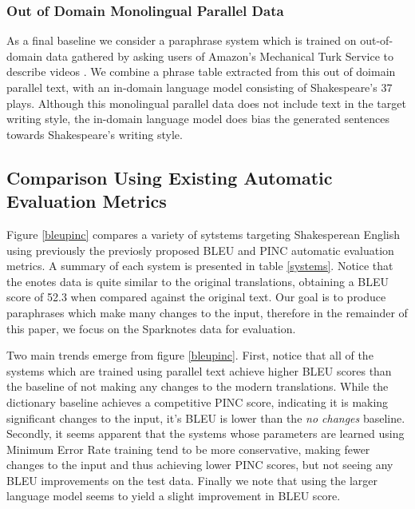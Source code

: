 \documentclass[10pt,a5paper,twoside]{article}
\begin{document}
\subsubsection{Out of Domain Monolingual Parallel Data}
As a final baseline we consider a paraphrase system which is trained on out-of-domain data gathered by asking users of Amazon's Mechanical Turk Service 
\cite{Snow08} to describe videos \cite{chen11}.  We combine a phrase table extracted from this out of doimain parallel text, with an in-domain
language model consisting of Shakespeare's 37 plays.  Although this monolingual parallel data does not include text in the target writing style,
the in-domain language model does bias the generated sentences towards Shakespeare's writing style.

\subsection{Comparison Using Existing Automatic Evaluation Metrics}
Figure \ref{bleupinc} compares a variety of sytstems targeting Shakesperean English using previously the previosly proposed BLEU \cite{Papineni02} and PINC \cite{chen11} automatic evaluation metrics.  A summary of each system is presented in table \ref{systems}.  Notice that the enotes data is quite similar to the original translations,
obtaining a BLEU score of 52.3 when compared against the original text.  Our goal is to produce paraphrases which make many changes to the input, therefore
in the remainder of this paper, we focus on the Sparknotes data for evaluation.

Two main trends emerge from figure \ref{bleupinc}.  First, notice that all of the systems which are trained using parallel text achieve higher BLEU scores than the baseline
of not making any changes to the modern translations.  While the dictionary baseline achieves a competitive PINC score, indicating it is making significant changes to the 
input, it's BLEU is lower than the \emph{no changes} baseline.  Secondly, it seems apparent that the systems whose parameters are learned using Minimum Error Rate training
tend to be more conservative, making fewer changes to the input and thus achieving lower PINC scores, but not seeing any BLEU improvements on the test data.  Finally
we note that using the larger language model seems to yield a slight improvement in BLEU score.
\end{document}
